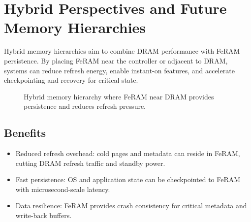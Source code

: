 \section{Hybrid Perspectives and Future Memory Hierarchies}

Hybrid memory hierarchies aim to combine DRAM performance with FeRAM persistence. By placing FeRAM near the controller or adjacent to DRAM, systems can reduce refresh energy, enable instant-on features, and accelerate checkpointing and recovery for critical state.

\begin{figure}[!t]
  \centering
  \caption{Hybrid memory hierarchy where FeRAM near DRAM provides persistence and reduces refresh pressure.}
  \label{fig:hybrid_hierarchy}
\end{figure}

\subsection*{Benefits}
\begin{itemize}
  \item Reduced refresh overhead: cold pages and metadata can reside in FeRAM, cutting DRAM refresh traffic and standby power.
  \item Fast persistence: OS and application state can be checkpointed to FeRAM with microsecond-scale latency.
  \item Data resilience: FeRAM provides crash consistency for critical metadata and write-back buffers.
\end{itemize}


